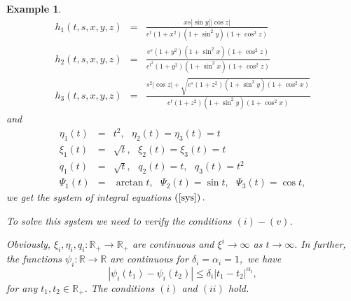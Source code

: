 \documentclass{amsart}
\theoremstyle{plain}
\newtheorem{example}{Example}
\numberwithin{equation}{section}
\begin{document}
\begin{example}
\begin{eqnarray*}
h_{1}\left( t,s,x,y,z\right) &=&\frac{xs\left\vert \sin y\right\vert
\left\vert \cos z\right\vert }{e^{t}\left( 1+x^{2}\right) \left( 1+\sin
^{2}y\right) \left( 1+\cos ^{2}z\right) } \\
h_{2}\left( t,s,x,y,z\right) &=&\frac{e^{s}\left( 1+y^{2}\right) \left(
1+\sin ^{2}x\right) \left( 1+\cos ^{2}z\right) }{e^{t^{2}}\left(
1+y^{2}\right) \left( 1+\sin ^{2}x\right) \left( 1+\cos ^{2}z\right) } \\
h_{3}\left( t,s,x,y,z\right) &=&\frac{s^{2}\left\vert \cos z\right\vert +\sqrt{e^{s}\left( 1+z^{2}\right) \left( 1+\sin ^{2}y\right) \left( 1+\cos
^{2}x\right) }}{e^{t}\left( 1+z^{2}\right) \left( 1+\sin ^{2}y\right) \left(
1+\cos ^{2}x\right) }
\end{eqnarray*}and\begin{eqnarray*}
\eta _{1}\left( t\right) &=&t^{2},\text{ }\eta _{2}\left( t\right) =\eta
_{3}\left( t\right) =t \\
\xi _{1}\left( t\right) &=&\sqrt{t},\text{ }\xi _{2}\left( t\right) =\xi
_{3}\left( t\right) =t \\
q_{1}\left( t\right) &=&\sqrt{t},\text{ }q_{2}\left( t\right) =t,\text{ }q_{3}\left( t\right) =t^{2} \\
\Psi _{1}\left( t\right) &=&\arctan t,\text{ }\Psi _{2}\left( t\right) =\sin
t,\text{ }\Psi _{3}\left( t\right) =\cos t,
\end{eqnarray*}we get the system of integral equations $\left( \text{\ref{sys}}\right) .$

To solve this system we need to verify the conditions $\left( i\right)
-\left( v\right) $.

Obviously, $\xi _{i},\eta _{i},q_{i}:\mathbb{R}_{+}\rightarrow \mathbb{R}_{+} $ are continuous and $\xi ^{i}\rightarrow \infty $ as $t\rightarrow
\infty .$ In further, the functions $\psi _{i}:\mathbb{R\rightarrow R}$ are
continuous for $\delta _{i}=\alpha _{i}=1$,\ we have\begin{equation*}
\left\vert \psi _{i}\left( t_{1}\right) -\psi _{i}\left( t_{2}\right)
\right\vert \leqslant \delta _{i}\left\vert t_{1}-t_{2}\right\vert ^{\alpha
_{i}},
\end{equation*}for any $t_{1},t_{2}\in \mathbb{R}_{+}$. The conditions $\left( i\right) $
and $\left( ii\right) $ hold.


\end{example}
\end{document}
